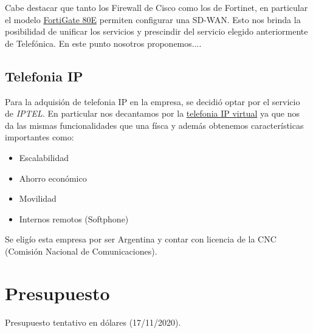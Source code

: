 \documentclass[11pt]{article}
\begin{document}
    Cabe destacar que tanto los Firewall de Cisco como los de Fortinet, en particular el modelo 
    \href{https://www.fortinet.com/content/dam/fortinet/assets/data-sheets/FortiGate_80E_Series.pdf}{FortiGate 80E} permiten configurar una SD-WAN. Esto nos brinda la 
    posibilidad de unificar los servicios y prescindir del servicio elegido anteriormente de Telefónica. En este punto nosotros proponemos....


    \subsection{Telefonia IP}
    Para la adquisión de telefonia IP en la empresa, se decidió optar por el servicio de \textit{IPTEL}. En particular nos decantamos por la
    \href{https://www.iptel.com.ar/centrales-telefonicas/virtuales/}{telefonia IP virtual} ya que nos da las mismas funcionalidades que una físca y además obtenemos
    características importantes como:
    \begin{itemize}
        \item Escalabilidad
        \item Ahorro económico
        \item Movilidad
        \item Internos remotos (Softphone)
    \end{itemize}

    Se eligío esta empresa por ser Argentina y contar con licencia de la CNC (Comisión Nacional de Comunicaciones).


    \section{Presupuesto}

    \begin{table}[H]
        \centering
        
        \caption{Presupuesto tentativo en dólares (17/11/2020).}
    \end{table}

    
\end{document}
